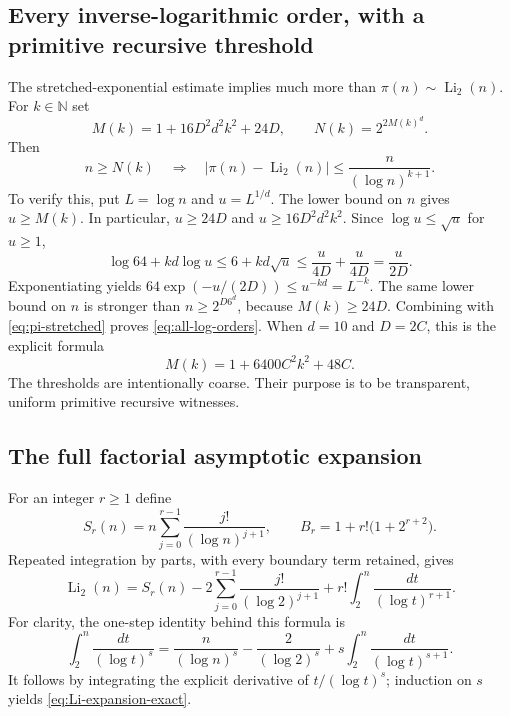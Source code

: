 \subsection{Every inverse-logarithmic order, with a primitive recursive threshold}

The stretched-exponential estimate implies much more than
$\pi(n)\sim\operatorname{Li}_2(n)$.  For $k\in\mathbb N$ set
\[
 M(k)=1+16D^2d^2k^2+24D,
 \qquad N(k)=2^{2M(k)^d}.
\]
Then
\begin{equation}\label{eq:all-log-orders}
 n\ge N(k)\quad\Longrightarrow\quad
 |\pi(n)-\operatorname{Li}_2(n)|
        \le\frac n{(\log n)^{k+1}}.
\end{equation}
To verify this, put $L=\log n$ and $u=L^{1/d}$.
The lower bound on $n$ gives $u\ge M(k)$.  In particular,
$u\ge24D$ and $u\ge16D^2d^2k^2$.
Since $\log u\le\sqrt u$ for $u\ge1$,
\[
 \log64+kd\log u
 \le6+kd\sqrt u
 \le\frac{u}{4D}+\frac{u}{4D}
 =\frac{u}{2D}.
\]
Exponentiating yields
$64\exp(-u/(2D))\le u^{-kd}=L^{-k}$.
The same lower bound on $n$ is stronger than $n\ge2^{D6^d}$, because
$M(k)\ge24D$.  Combining with \eqref{eq:pi-stretched} proves
\eqref{eq:all-log-orders}.
When $d=10$ and $D=2C$, this is the explicit formula
\[
 M(k)=1+6400C^2k^2+48C.
\]
The thresholds are intentionally coarse.  Their purpose is to be
transparent, uniform primitive recursive witnesses.

\subsection{The full factorial asymptotic expansion}

For an integer $r\ge1$ define
\[
 S_r(n)=n\sum_{j=0}^{r-1}\frac{j!}{(\log n)^{j+1}},
 \qquad B_r=1+r!\bigl(1+2^{r+2}\bigr).
\]
Repeated integration by parts, with every boundary term retained, gives
\begin{equation}\label{eq:Li-expansion-exact}
 \operatorname{Li}_2(n)
  =S_r(n)
   -2\sum_{j=0}^{r-1}\frac{j!}{(\log2)^{j+1}}
   +r!\int_2^n\frac{dt}{(\log t)^{r+1}}.
\end{equation}
For clarity, the one-step identity behind this formula is
\[
 \int_2^n\frac{dt}{(\log t)^s}
 =\frac n{(\log n)^s}-\frac2{(\log2)^s}
       +s\int_2^n\frac{dt}{(\log t)^{s+1}}.
\]
It follows by integrating the explicit derivative of
$t/(\log t)^s$; induction on $s$ yields
\eqref{eq:Li-expansion-exact}.

